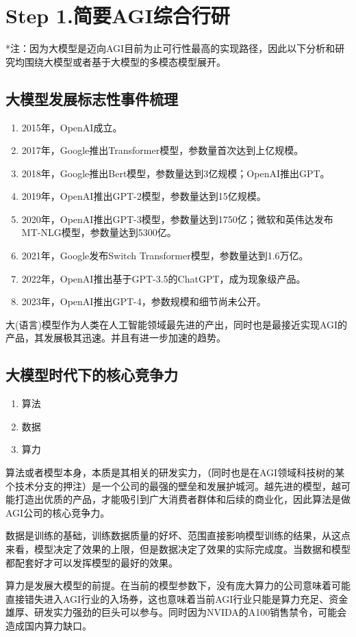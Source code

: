 \section{Step 1.简要AGI综合行研}
*注：因为大模型是迈向AGI目前为止可行性最高的实现路径，因此以下分析和研究均围绕大模型或者基于大模型的多模态模型展开。
\subsection{大模型发展标志性事件梳理}
\begin{enumerate}
    \item 2015年，OpenAI成立。
    \item 2017年，Google推出Transformer模型，参数量首次达到上亿规模。
    \item 2018年，Google推出Bert模型，参数量达到3亿规模；OpenAI推出GPT。
    \item 2019年，OpenAI推出GPT-2模型，参数量达到15亿规模。
    \item 2020年，OpenAI推出GPT-3模型，参数量达到1750亿；微软和英伟达发布MT-NLG模型，参数量达到5300亿。
    \item 2021年，Google发布Switch Transformer模型，参数量达到1.6万亿。
    \item 2022年，OpenAI推出基于GPT-3.5的ChatGPT，成为现象级产品。
    \item 2023年，OpenAI推出GPT-4，参数规模和细节尚未公开。
\end{enumerate}
大(语言)模型作为人类在人工智能领域最先进的产出，同时也是最接近实现AGI的产品，其发展极其迅速。并且有进一步加速的趋势。
\subsection{大模型时代下的核心竞争力}
\begin{enumerate}
    \item 算法
    \item 数据
    \item 算力
\end{enumerate}
算法或者模型本身，本质是其相关的研发实力，（同时也是在AGI领域科技树的某个技术分支的押注）是一个公司的最强的壁垒和发展护城河。越先进的模型，越可能打造出优质的产品，才能吸引到广大消费者群体和后续的商业化，因此算法是做AGI公司的核心竞争力。

数据是训练的基础，训练数据质量的好坏、范围直接影响模型训练的结果，从这点来看，模型决定了效果的上限，但是数据决定了效果的实际完成度。当数据和模型都配套好才可以发挥模型的最好的效果。

算力是发展大模型的前提。在当前的模型参数下，没有庞大算力的公司意味着可能直接错失进入AGI行业的入场券，这也意味着当前AGI行业只能是算力充足、资金雄厚、研发实力强劲的巨头可以参与。同时因为NVIDA的A100销售禁令，可能会造成国内算力缺口。

